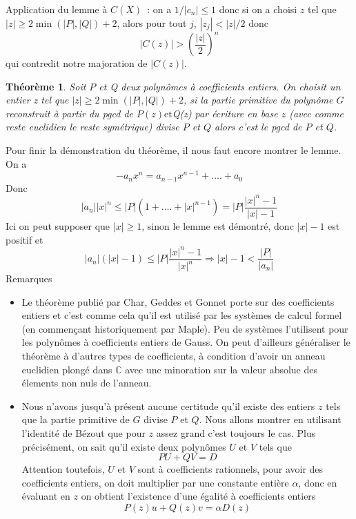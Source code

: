 \documentclass[a4paper,11pt]{article}
\newtheorem{thm}{Théorème}
\begin{document}
\begin{giacjshere}
Application du lemme à $C(X)$~: on a $1/|c_n|\leq 1$
donc si on a choisi $z$ tel que $| z | \geq 2 \min ( | P |, | Q | ) + 2$,
alors pour tout $j$, $| z_j | < | z | / 2$ donc
\[ | C ( z ) | > \left( \frac{| z |}{2} \right)^n \]
qui contredit notre majoration de $| C ( z ) |$.

\begin{thm}
  Soit $P$ et Q deux polynômes à coefficients entiers. On
  choisit un entier z tel que $| z | \geq 2 \min ( | P |, | Q | ) + 2$,
  si la partie primitive du polynôme $G$ reconstruit à partir du pgcd de $P (
  z ) \mbox{et}$Q(z) par écriture en base $z$ (avec comme reste euclidien le
  reste symétrique) divise $P$ et $Q$ alors c'est le pgcd de $P$ et $Q$.
\end{thm}

Pour finir la démonstration du théorème, il nous faut encore montrer le lemme.
On a
\[ - a_n x^n = a_{n - 1} x^{n - 1} + \ldots . + a_0 \]
Donc
\[ | a_n | | x |^n \leq | P | ( 1 + \ldots . + | x |^{n - 1} ) = | P |
   \frac{| x |^n - 1}{| x | - 1} \]
Ici on peut supposer que $| x | \geq 1$, sinon le lemme est démontré,
donc $| x | - 1$ est positif et
\[ | a_n | ( | x | - 1 ) \leq | P | \frac{| x |^n - 1}{| x |^n}
   \Rightarrow | x | - 1 < \frac{| P |}{| a_n |} \]
Remarques
\begin{itemize}
  \item Le théorème publié par Char, Geddes et Gonnet 
  porte sur des coefficients entiers et
  c'est comme cela qu'il est utilisé par les systèmes de calcul formel (en
  commençant historiquement par Maple). Peu de systèmes l'utilisent pour les
  polynômes à coefficients entiers de Gauss. On peut d'ailleurs généraliser le
  théorème à d'autres types de coefficients, à condition d'avoir un anneau
  euclidien plongé dans $\mathbb{C}$ avec une minoration sur la valeur absolue
  des élements non nuls de l'anneau.
  
  \item Nous n'avons jusqu'à présent aucune certitude qu'il existe des entiers
  $z$ tels que la partie primitive de $G$ divise $P$ et $Q$. Nous allons
  montrer en utilisant l'identité de Bézout que pour $z$ assez grand c'est
  toujours le cas. Plus précisément, on sait qu'il existe deux polynômes $U$
  et $V$ tels que
  \[ P U + Q V = D \]
  Attention toutefois, $U$ et $V$ sont à coefficients rationnels, pour avoir
  des coefficients entiers, on doit multiplier par une constante entière
  $\alpha$, donc en évaluant en $z$ on obtient l'existence d'une égalité à
  coefficients entiers
  \[ P ( z ) u + Q ( z ) v = \alpha D ( z ) \]
  

\end{itemize}
\end{giacjshere}
\end{document}
